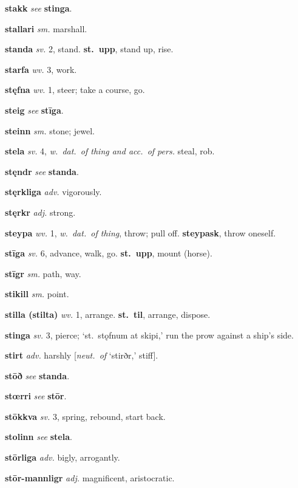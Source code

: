\documentclass[12pt,letterpaper]{book}
\begin{document}
\noindent
\textbf{stakk} \textit{} \textit{see} \textbf{stinga}.

\noindent
\textbf{stallari} \textit{sm.} marshall.

\noindent
\textbf{standa} \textit{sv.} 2, stand.  \textbf{st.\ upp}, stand up, rise.

\noindent
\textbf{starfa} \textit{wv.} 3, work.

\noindent
\textbf{stęfna} \textit{wv.} 1, steer; take a course, go.

\noindent
\textbf{steig} \textit{} \textit{see} \textbf{stīga}.

\noindent
\textbf{steinn} \textit{sm.} stone; jewel.

\noindent
\textbf{stela} \textit{sv.} 4, \textit{w.\ dat.\ of thing and acc.\ of pers.}
	steal, rob.

\noindent
\textbf{stęndr} \textit{} \textit{see} \textbf{standa}.

\noindent
\textbf{stęrkliga} \textit{adv.} vigorously.

\noindent
\textbf{stęrkr} \textit{adj.} strong.

\noindent
\textbf{steypa} \textit{wv.} 1, \textit{w.\ dat.\ of thing}, throw; pull off.
	\textbf{steypask}, throw oneself.

\noindent
\textbf{stīga} \textit{sv.} 6, advance, walk, go.  \textbf{st.\ upp}, mount
	(horse).

\noindent
\textbf{stīgr} \textit{sm.} path, way.

\noindent
\textbf{stikill} \textit{sm.} point.

\noindent
\textbf{stilla (stilta)} \textit{wv.} 1, arrange.  \textbf{st.\ til},
	arrange, dispose.

\noindent
\textbf{stinga} \textit{sv.} 3, pierce; `st.\ stǫfnum at skipi,' run the prow
    against a ship's side.

\noindent
\textbf{stirt} \textit{adv.} harshly [\textit{neut.\ of} `stirðr,' stiff].

\noindent
\textbf{stōð} \textit{} \textit{see} \textbf{standa}.

\noindent
\textbf{stœrri} \textit{} \textit{see} \textbf{stōr}.

\noindent
\textbf{stōkkva} \textit{sv.} 3, spring, rebound, start back.

\noindent
\textbf{stolinn} \textit{} \textit{see} \textbf{stela}.

\noindent
\textbf{stōrliga} \textit{adv.} bigly, arrogantly.

\noindent
\textbf{stōr-mannligr} \textit{adj.} magnificent, aristocratic.
\end{document}
